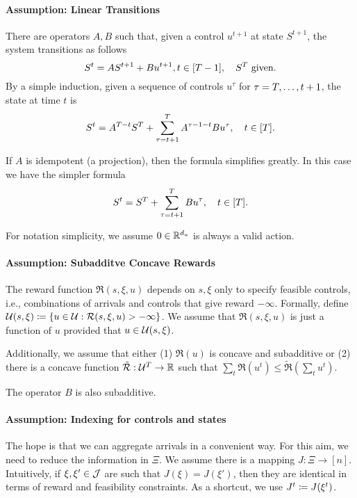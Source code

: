 \documentclass[letterpaper,11pt]{article}
\begin{document}
\paragraph{Assumption: Linear Transitions}
There are operators $A,B$ such that, given a control $u^{t+1}$ at state $S^{t+1}$, the system transitions as follows
\[
S^{t} = AS^{t+1} + Bu^{t+1}, t\in[T-1], \quad 
S^T \text{ given}.
\]
By a simple induction, given a sequence of controls $u^\tau$ for $\tau=T,\ldots,t+1$, the state at time $t$ is
\[
S^t = A^{T-t}S^T + \sum_{\tau=t+1}^T A^{\tau-1-t}Bu^\tau, \quad t\in[T].
\]

If $A$ is idempotent (a projection), then the formula simplifies greatly.
In this case we have the simpler formula
\begin{equation}\label{eq:linear_state}
S^t = S^T + \sum_{\tau=t+1}^T Bu^\tau, \quad t\in[T].
\end{equation}

For notation simplicity, we assume $0\in \mathbb{R}^{d_u}$ is always a valid action.

\paragraph{Assumption: Subadditve Concave Rewards}
The reward function $\Re(s,\xi,u)$ depends on $s,\xi$ only to specify feasible controls, i.e., combinations of arrivals and controls that give reward $-\infty$.
Formally, define $\mathcal{U}(s,\xi)\coloneqq \{u\in\mathcal{U}: \mathcal{R}(s,\xi,u)>-\infty\}$.
We assume that $\Re(s,\xi,u)$ is just a function of $u$ provided that $u\in\mathcal{U}(s,\xi)$.

Additionally, we assume that either (1) $\Re(u)$ is concave and subadditive or (2) there is a concave function $\tilde {\mathcal{R}}:\mathcal{U}^T\to\mathbb{R}$ such that $\sum_t\Re(u^t)\leq \tilde \Re(\sum_t u^t)$.

The operator $B$ is also subadditive.


\paragraph{Assumption: Indexing for controls and states}
The hope is that we can aggregate arrivals in a convenient way.
For this aim, we need to reduce the information in $\Xi$.
We assume there is a mapping $J:\Xi\to[n]$.
Intuitively, if $\xi,\xi'\in\mathcal{J}$ are such that $J(\xi)=J(\xi')$, then they are identical in terms of reward and feasibility constraints.
As a shortcut, we use $J^t\coloneqq J(\xi^t)$.
\end{document}
